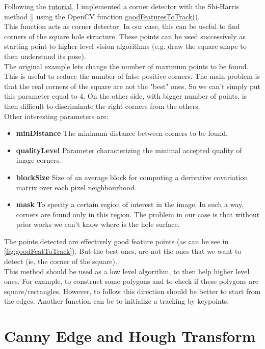 Following the \href{https://docs.opencv.org/3.4.6/d8/dd8/tutorial_good_features_to_track.html}{tutorial}, I implemented a corner detector with the Shi-Harris method [\cite{Shi94goodfeatures}] using the OpenCV function \href{https://docs.opencv.org/3.4.6/dd/d1a/group__imgproc__feature.html#ga1d6bb77486c8f92d79c8793ad995d541}{goodFeaturesToTrack()}.\\
This function acts as corner detector. In our case, this can be useful to find corners of the square hole structure. These points can be used successively as starting point to higher level vision algorithms (e.g. draw the square shape to then understand its pose).\\
The original example lets change the number of maximum points to be found. This is useful to reduce the number of false positive corners. The main problem is that the real corners of the square are not the "best" ones. So we can't simply put this parameter equal to 4. On the other side, with bigger number of points, is then difficult to discriminate the right corners from the others.\\
Other interesting parameters are:
\begin{itemize}
	\item \textbf{minDistance} The minimum distance between corners to be found.
	\item \textbf{qualityLevel} Parameter characterizing the minimal accepted quality of image corners.
	\item \textbf{blockSize} Size of an average block for computing a derivative covariation matrix over each pixel neighbourhood.
	\item \textbf{mask} To specify a certain region of interest in the image. In such a way, corners are found only in this region. The problem in our case is that without prior works we can't know where is the hole surface.
\end{itemize}
The points detected are effectively good feature points (as can be see in \ref{fig:goodFeatToTrack}). But the best ones, are not the ones that we want to detect (ie, the corner of the square).\\
This method should be used as a low level algorithm, to then help higher level ones. For example, to construct some polygons and to check if these polygons are square/rectangles. However, to follow this direction should be better to start from the edges. Another function can be to initialize a tracking by keypoints.\\
  
\section{Canny Edge and Hough Transform}
\label{sec:HoughTrasf}

